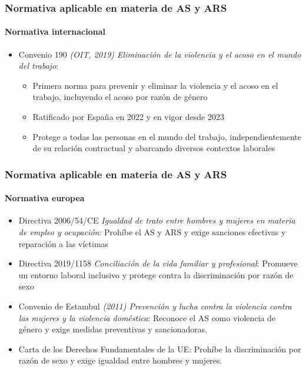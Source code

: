 \documentclass{beamer}
\newcommand{\highlight}[1]{{\color{Blue} #1}}
\begin{document}
    \begin{frame}
        \frametitle{Normativa aplicable en materia de AS y ARS}
        \framesubtitle{Normativa internacional}
        \begin{itemize}
            \item \highlight{Convenio 190} \textit{(OIT, 2019) Eliminación de la violencia y el acoso en el mundo del trabajo}:
            \begin{itemize}
                \item Primera norma para prevenir y eliminar la violencia y el acoso en el trabajo, incluyendo el acoso por razón de género
                \item Ratificado por España en 2022 y en vigor desde 2023
                \item Protege a todas las personas en el mundo del trabajo, independientemente de su relación contractual y abarcando diversos contextos laborales
            \end{itemize}
        \end{itemize}
    \end{frame}

    \begin{frame}
        \frametitle{Normativa aplicable en materia de AS y ARS}
        \framesubtitle{Normativa europea}
        \begin{itemize}
            \item \highlight{Directiva 2006/54/CE} \textit{Igualdad de trato entre hombres y mujeres en materia de empleo y ocupación}: Prohíbe el AS y ARS y exige sanciones efectivas y reparación a las víctimas
            \item \highlight{Directiva 2019/1158} \textit{Conciliación de la vida familiar y profesional}: Promueve un entorno laboral inclusivo y protege contra la discriminación por razón de sexo
            \item \highlight{Convenio de Estambul} \textit{(2011) Prevención y lucha contra la violencia contra las mujeres y la violencia doméstica}: Reconoce el AS como violencia de género y exige medidas preventivas y sancionadoras.
            \item \highlight{Carta de los Derechos Fundamentales de la UE}: Prohíbe la discriminación por razón de sexo y exige igualdad entre hombres y mujeres.
        \end{itemize}
    \end{frame}
\end{document}
